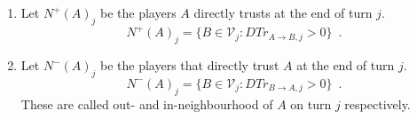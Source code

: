 \begin{definition}[Neighbourhood]
  \label{neighbourhood}
  \begin{enumerate}
    \item Let $N^{+}\left(A\right)_j$ be the players $A$ directly trusts at the end of turn $j$.
      \begin{equation}
        N^{+}\left(A\right)_j = \{B \in \mathcal{V}_j : DTr_{A \rightarrow B, j} > 0\} \enspace.
      \end{equation}
    \item Let $N^{-}\left(A\right)_j$ be the players that directly trust $A$ at the end of turn $j$.
      \begin{equation}
        N^{-}\left(A\right)_j = \{B \in \mathcal{V}_j : DTr_{B \rightarrow A, j} > 0\} \enspace.
      \end{equation}
      These are called out- and in-neighbourhood of $A$ on turn $j$ respectively.
  \end{enumerate}
\end{definition}
